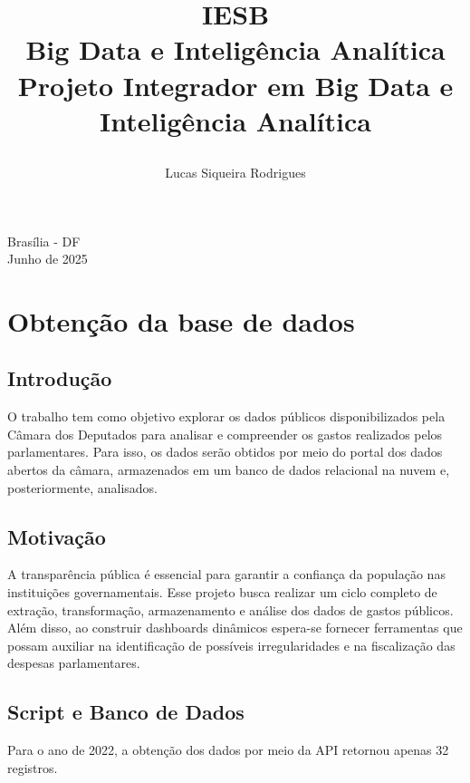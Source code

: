 \documentclass[12pt, a4paper]{article}
\title{
    \textbf{IESB} \\
    \large Big Data e Inteligência Analítica \\
    \vspace{10cm}
    \textbf{Projeto Integrador em Big Data e Inteligência Analítica}
    \author{Lucas Siqueira Rodrigues}
    \date{}
}
\begin{document}
\begin{titlepage} 
    \maketitle
    \begin{center}
        \vspace{\fill}
        Brasília - DF \\
        Junho de 2025
    \end{center}
\end{titlepage}

\section{Obtenção da base de dados}
\subsection{Introdução}
O trabalho tem como objetivo explorar os dados públicos disponibilizados pela Câmara dos Deputados para analisar e compreender os gastos realizados pelos parlamentares. Para isso, os dados serão obtidos por meio do portal dos dados abertos da câmara\cite{dados_abertos}, armazenados em um banco de dados relacional na nuvem e, posteriormente, analisados.

\subsection{Motivação}
A transparência pública é essencial para garantir a confiança da população nas instituições governamentais. Esse projeto busca realizar um ciclo completo de extração, transformação, armazenamento e análise dos dados de gastos públicos. Além disso, ao construir dashboards dinâmicos espera-se fornecer ferramentas que possam auxiliar na identificação de possíveis irregularidades e na fiscalização das despesas parlamentares.


\subsection{Script e Banco de Dados}
Para o ano de 2022, a obtenção dos dados por meio da API\cite{dados_abertos} retornou apenas 32 registros.
\end{document}
